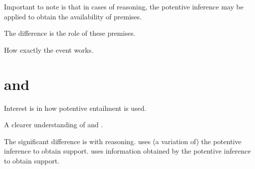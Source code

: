 \begin{note}
  Important to note is that in cases of reasoning, the potentive inference may be applied to obtain the availability of premises.

  The difference is the role of these premises.
\end{note}

\begin{note}
  How exactly the event works.
\end{note}

\section{\AR{} and \WR{}}
\label{sec:ar-wr}

\begin{note}[Overview]
  Interest is in how potentive entailment is used.

  A clearer understanding of \AR{} and \WR{}.

  The significant difference is with reasoning.
  \AR{} uses (a variation of) the potentive inference to obtain support.
  \WR{} uses information obtained by the potentive inference to obtain support.
\end{note}

